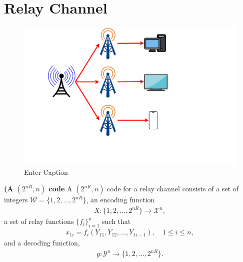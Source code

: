 \section{Relay Channel}

\begin{figure}
    \centering
    \includegraphics[width=0.5\linewidth]{Presentation Diagrams/RC.png}
    \caption{Enter Caption}
    \label{fig:enter-label}
\end{figure}




%
\begin{tcolorbox}[boxrule=0pt,frame hidden,sharp corners,enhanced, opacityback=0, borderline west={2pt}{0pt}{red}]
\begin{defn} \textbf{(A $(2^{nR},n)$ code} A $(2^{nR}, n)$ code for a relay channel consists of a set of integers $\mathcal{W} = \{1,2,...,2^{nR} \}$, an encoding function
%
\begin{eqnarray}
    X: \{1,2,...,2^{nR}\} \rightarrow \mathcal{X}^n,
\end{eqnarray}
%
a set of relay functions $\{ f_i \}_{i=1}^n$ such that
%
\begin{eqnarray}
    x_{1i} = f_i(Y_{11}, Y_12,...,Y_{1i-1}), \quad 1\leq i \leq n,
\end{eqnarray}
%
and a decoding function,
%
\begin{eqnarray}
    g: \mathcal{Y}^n \rightarrow \{1,2,...,2^{nR}\}.
\end{eqnarray}


\end{defn}
\end{tcolorbox}
%